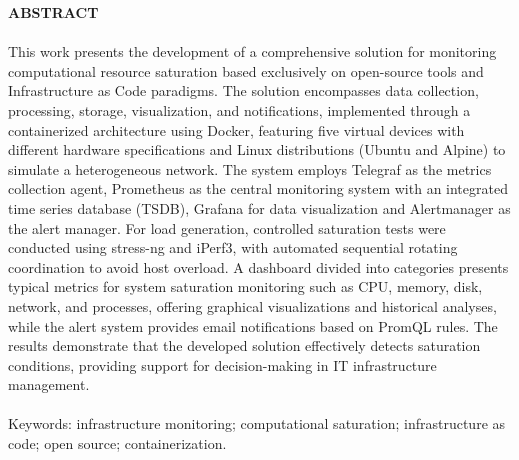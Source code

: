 \begin{center}

\textbf{ABSTRACT}

\end{center}

\vspace{0.5cm}

\paragraph{}

This work presents the development of a comprehensive solution for monitoring computational resource saturation based exclusively on open-source tools and Infrastructure as Code paradigms. The solution encompasses data collection, processing, storage, visualization, and notifications, implemented through a containerized architecture using Docker, featuring five virtual devices with different hardware specifications and Linux distributions (Ubuntu and Alpine) to simulate a heterogeneous network. The system employs Telegraf as the metrics collection agent, Prometheus as the central monitoring system with an integrated time series database (TSDB), Grafana for data visualization and Alertmanager as the alert manager. For load generation, controlled saturation tests were conducted using stress-ng and iPerf3, with automated sequential rotating coordination to avoid host overload. A dashboard divided into categories presents typical metrics for system saturation monitoring such as CPU, memory, disk, network, and processes, offering graphical visualizations and historical analyses, while the alert system provides email notifications based on PromQL rules. The results demonstrate that the developed solution effectively detects saturation conditions, providing support for decision-making in IT infrastructure management.

\paragraph{}

\noindent Keywords: infrastructure monitoring; computational saturation; infrastructure as code; open source; containerization.

\pagebreak
